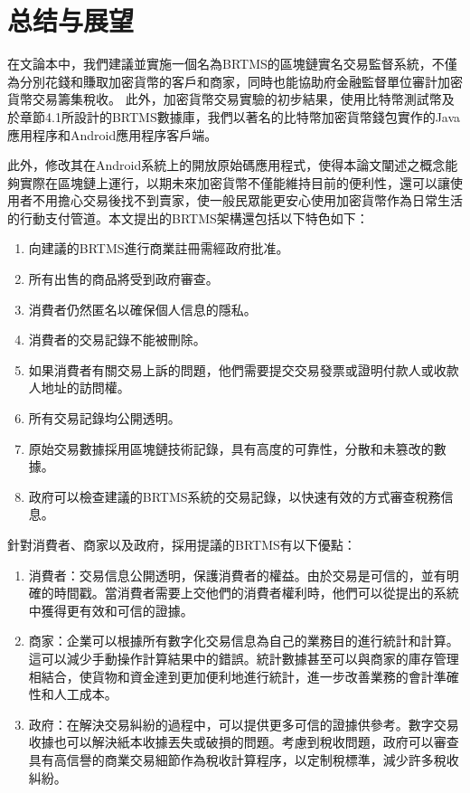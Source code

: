  
\chapter{总结与展望}
在文論本中，我們建議並實施一個名為BRTMS的區塊鏈實名交易監督系統，不僅為分別花錢和賺取加密貨幣的客戶和商家，同時也能協助府金融監督單位審計加密貨幣交易籌集稅收。 此外，加密貨幣交易實驗的初步結果，使用比特幣測試幣及於章節4.1所設計的BRTMS數據庫，我們以著名的比特幣加密貨幣錢包實作的Java應用程序和Android應用程序客戶端。
	
此外，修改其在Android系統上的開放原始碼應用程式，使得本論文闡述之概念能夠實際在區塊鏈上運行，以期未來加密貨幣不僅能維持目前的便利性，還可以讓使用者不用擔心交易後找不到賣家，使一般民眾能更安心使用加密貨幣作為日常生活的行動支付管道。本文提出的BRTMS架構還包括以下特色如下：

		\begin{enumerate}
			\item 向建議的BRTMS進行商業註冊需經政府批准。
			\item 所有出售的商品將受到政府審查。
			\item 消費者仍然匿名以確保個人信息的隱私。
			\item 消費者的交易記錄不能被刪除。
			\item 如果消費者有關交易上訴的問題，他們需要提交交易發票或證明付款人或收款人地址的訪問權。
			\item 所有交易記錄均公開透明。
			\item 原始交易數據採用區塊鏈技術記錄，具有高度的可靠性，分散和未篡改的數據。
			\item 政府可以檢查建議的BRTMS系統的交易記錄，以快速有效的方式審查稅務信息。
		\end{enumerate}

針對消費者、商家以及政府，採用提議的BRTMS有以下優點：

	\begin{enumerate}
		\item 消費者：交易信息公開透明，保護消費者的權益。由於交易是可信的，並有明確的時間戳。當消費者需要上交他們的消費者權利時，他們可以從提出的系統中獲得更有效和可信的證據。
		\item 商家：企業可以根據所有數字化交易信息為自己的業務目的進行統計和計算。這可以減少手動操作計算結果中的錯誤。統計數據甚至可以與商家的庫存管理相結合，使貨物和資金達到更加便利地進行統計，進一步改善業務的會計準確性和人工成本。
		\item 政府：在解決交易糾紛的過程中，可以提供更多可信的證據供參考。數字交易收據也可以解決紙本收據丟失或破損的問題。考慮到稅收問題，政府可以審查具有高信譽的商業交易細節作為稅收計算程序，以定制稅標準，減少許多稅收糾紛。
	\end{enumerate}
	